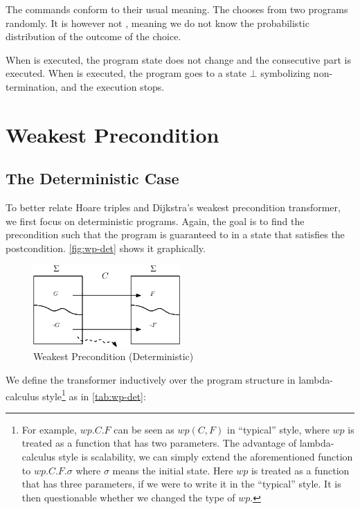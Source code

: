 The  commands conform to their usual meaning.
The   chooses from two programs randomly. 
It is however not , meaning we do not know the probabilistic distribution of the outcome of the choice. 

When  is executed, the program state does not change and the consecutive part is executed. 
When  is executed, the program goes to a state $\bot$ symbolizing non-termination, and the execution stops. 


\section{Weakest Precondition}\label{sec:wp}

\subsection{The Deterministic Case}\label{sec:wp-det}
To better relate Hoare triples and Dijkstra's weakest precondition transformer, we first focus on deterministic programs. 
Again, the goal is to find the  precondition such that the program is guaranteed to  in a state that satisfies the postcondition. 
\autoref{fig:wp-det} shows it graphically. 

\begin{figure}[ht!]\centering
\includegraphics[width=0.5\textwidth]{image/wp-det.eps}
\caption{Weakest Precondition (Deterministic)}
\label{fig:wp-det}
\end{figure}

We define the  transformer inductively over the program structure in lambda-calculus style\footnote{For example, $wp.C.F$ can be seen as $wp(C,F)$ in ``typical'' style, where $wp$ is treated as a function that has two parameters. The advantage of lambda-calculus style is scalability, we can simply extend the aforementioned function to $wp.C.F.\sigma$ where $\sigma$ means the initial state. Here $wp$ is treated as a function that has three parameters, if we were to write it in the ``typical'' style. It is then questionable whether we changed the type of $wp$. } as in \autoref{tab:wp-det}: 

